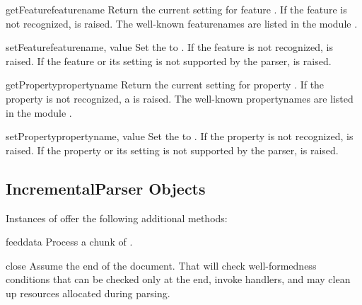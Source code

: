 \begin{methoddesc}[XMLReader]{getFeature}{featurename}
  Return the current setting for feature .  If the
  feature is not recognized,  is
  raised. The well-known featurenames are listed in the module
  .
\end{methoddesc}

\begin{methoddesc}[XMLReader]{setFeature}{featurename, value}
  Set the  to . If the feature is not
  recognized,  is raised. If the
  feature or its setting is not supported by the parser,
   is raised.
\end{methoddesc}

\begin{methoddesc}[XMLReader]{getProperty}{propertyname}
  Return the current setting for property . If the
  property is not recognized, a 
  is raised. The well-known propertynames are listed in the module
  .
\end{methoddesc}

\begin{methoddesc}[XMLReader]{setProperty}{propertyname, value}
  Set the  to . If the property is not
  recognized,  is raised. If the
  property or its setting is not supported by the parser,
   is raised.
\end{methoddesc}


\subsection{IncrementalParser Objects
            \label{incremental-parser-objects}}

Instances of  offer the following additional
methods:

\begin{methoddesc}[IncrementalParser]{feed}{data}
  Process a chunk of .
\end{methoddesc}

\begin{methoddesc}[IncrementalParser]{close}{}
  Assume the end of the document. That will check well-formedness
  conditions that can be checked only at the end, invoke handlers, and
  may clean up resources allocated during parsing.
\end{methoddesc}

